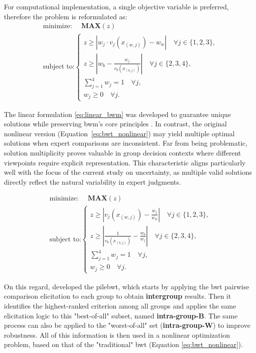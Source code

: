 For computational implementation, a single objective variable is preferred, therefore the problem is reformulated as:
\begin{equation}
\begin{aligned}
&\text{minimize: } \quad \textbf{MAX} (z) \\
&\text{subject to:}  
 \begin{cases}
 z \geq |w_j \cdot v_j(x_{(w,j)}) - w_w| \quad \forall j \in \{1,2,3\}, \\
 z \geq \left|w_b - \frac{w_j}{v_b(x_{(b,j)})}\right| \quad \forall j \in \{2,3,4\}, \\
 \sum_{j=1}^{4} w_j = 1 \quad \forall j, \\
 w_j \geq 0 \quad \forall j.
 \label{eq:linear_bwm}
\end{cases}
\end{aligned}
\end{equation}

The linear formulation \ref{eq:linear_bwm} was developed to guarantee unique solutions while preserving \gls{bwm}'s core principles \cite{REZAEI2016126}. In contrast, the original nonlinear version (Equation~\ref{eq:bwt_nonlinear}) \cite{REZAEI201549} may yield multiple optimal solutions when expert comparisons are inconsistent. Far from being problematic, solution multiplicity proves valuable in group decision contexts where different viewpoints require explicit representation. This characteristic aligns particularly well with the focus of the current study on uncertainty, as multiple valid solutions directly reflect the natural variability in expert judgments.

\begin{equation}
\begin{aligned}
&\text{minimize: } \quad \textbf{MAX} (z) \\
&\text{subject to:}  
 \begin{cases}
 z \geq | v_j(x_{(w,j)}) - \frac{w_j}{w_w}| \quad \forall j \in \{1,2,3\}, \\
 z \geq \left|\frac{1}{v_b(x_{(b,j)})} - \frac{w_b}{w_j} \right| \quad \forall j \in \{2,3,4\}, \\
 \sum_{j=1}^{4} w_j = 1 \quad \forall j, \\
 w_j \geq 0 \quad \forall j.
\end{cases}
\end{aligned}
\label{eq:bwt_nonlinear}
\end{equation}

On this regard, \cite{Huang2026}  developed the \acrshort{pilebwt}, which starts by applying the \gls{bwt} pairwise comparison elicitation to each group to obtain \textbf{intergroup} results. Then it identifies the highest-ranked criterion among all groups and applies the same elicitation logic to this "best-of-all" subset, named \textbf{intra-group-B}. The same process can also be applied to the "worst-of-all" set (\textbf{intra-group-W}) to improve robustness. All of this information is then used in a nonlinear optimization problem, based on that of the "traditional" \gls{bwt} (Equation \ref{eq:bwt_nonlinear}). 

